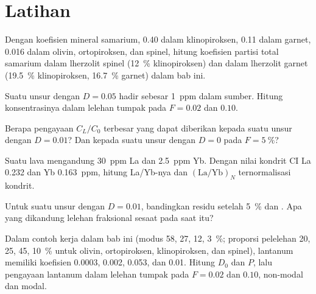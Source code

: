 \section{Latihan}

\begin{exercise}[$\star$]\label{exo:b3:trace-element-modelling:1}
Dengan koefisien mineral samarium, 0.40 dalam klinopiroksen, 0.11 dalam
garnet, 0.016 dalam olivin, ortopiroksen, dan spinel, hitung koefisien
partisi total samarium dalam lherzolit spinel (\qty{12}{\percent}
klinopiroksen) dan dalam lherzolit garnet (\qty{19.5}{\percent} klinopiroksen,
\qty{16.7}{\percent} garnet) dalam bab ini.
\end{exercise}

\begin{exercise}[$\star$]\label{exo:b3:trace-element-modelling:2}
Suatu unsur dengan $D = 0.05$ hadir sebesar \qty{1}{ppm} dalam sumber. Hitung
konsentrasinya dalam lelehan tumpak pada $F = 0.02$ dan $0.10$.
\end{exercise}

\begin{exercise}[$\star$]\label{exo:b3:trace-element-modelling:3}
Berapa pengayaan $C_L/C_0$ terbesar yang dapat diberikan  kepada suatu
unsur dengan $D = 0.01$? Dan kepada suatu unsur dengan $D = 0$ pada
$F = \qty{5}{\percent}$?
\end{exercise}

\begin{exercise}[$\star$]\label{exo:b3:trace-element-modelling:4}
Suatu lava mengandung \qty{30}{ppm} La dan \qty{2.5}{ppm} Yb. Dengan nilai kondrit CI
La 0.232 dan Yb \qty{0.163}{ppm}, hitung La/Yb-nya dan
$(\mathrm{La}/\mathrm{Yb})_N$ ternormalisasi kondrit.
\end{exercise}

\begin{exercise}[$\star\star$]\label{exo:b3:trace-element-modelling:5}
Untuk suatu unsur dengan $D = 0.01$, bandingkan residu setelah \qty{5}{\percent}
 dan . Apa yang dikandung lelehan fraksional
sesaat pada saat itu?
\end{exercise}

\begin{exercise}[$\star\star$]\label{exo:b3:trace-element-modelling:6}
Dalam contoh kerja dalam bab ini (modus 58, 27, 12, \qty{3}{\percent};
proporsi pelelehan 20, 25, 45, \qty{10}{\percent} untuk olivin,
ortopiroksen, klinopiroksen, dan spinel), lantanum memiliki koefisien
0.0003, 0.002, 0.053, dan 0.01. Hitung $D_0$ dan $P$, lalu pengayaan
lantanum dalam lelehan tumpak pada $F = 0.02$ dan $0.10$, non-modal dan modal.
\end{exercise}

